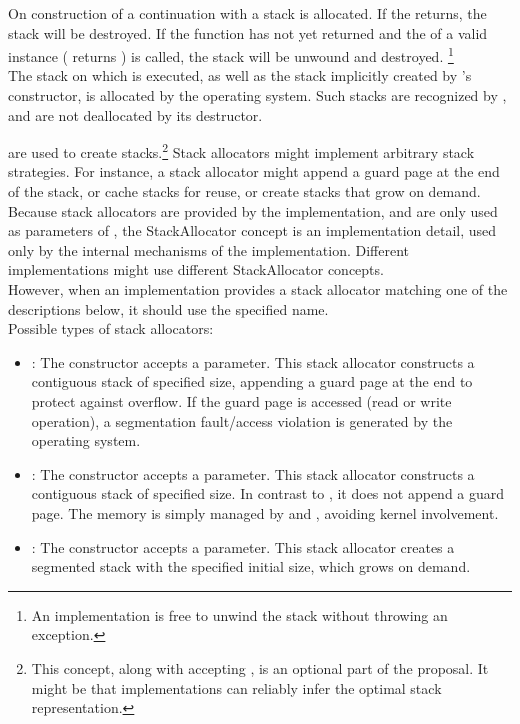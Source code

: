 \label{subsec:destruction}
On construction of a continuation with \call a stack is allocated. If the
\entryfn returns, the stack will be destroyed. If the function has not
yet returned and the  of a valid \cont instance (\opbool
returns ) is called, the stack will be unwound and destroyed.
\footnote{An implementation is free to unwind the stack without throwing an
exception.}\\
The stack on which  is executed, as well as the stack implicitly
created by 's constructor, is allocated by the operating
system. Such stacks are recognized by \cont, and are not deallocated by its
destructor.


\label{subsec:stackalloc}
are used to create stacks.\footnote{This concept, along with \call accepting
, is an optional part of the proposal. It might be
that implementations can reliably infer the optimal stack representation.}
Stack allocators might implement arbitrary stack strategies. For instance, a
stack allocator might append a guard page at the end of the stack, or cache
stacks for reuse, or create stacks that grow on demand.\\
Because stack allocators are provided by the implementation, and are only used
as parameters of \call, the StackAllocator concept is an implementation detail,
used only by the internal mechanisms of the \cc implementation. Different
implementations might use different StackAllocator concepts.\\
However, when an implementation provides a stack allocator matching one of
the descriptions below, it should use the specified name.\\
Possible types of stack allocators:
\begin{itemize}
    \item {}: The constructor accepts a 
        parameter. This stack allocator constructs a contiguous stack of
        specified size, appending a guard page at the end to protect against
        overflow. If the guard page is accessed (read or write operation), a
        segmentation fault/access violation is generated by the operating
        system.
    \item {}: The constructor accepts a  parameter.
        This stack allocator constructs a contiguous stack of specified size.
        In contrast to , it does not append a guard
        page. The memory is simply managed by 
        and , avoiding kernel involvement.
    \item {}: The constructor accepts a  parameter.
        This stack allocator creates a segmented stack with the specified
        initial size, which grows on demand.
\end{itemize}


